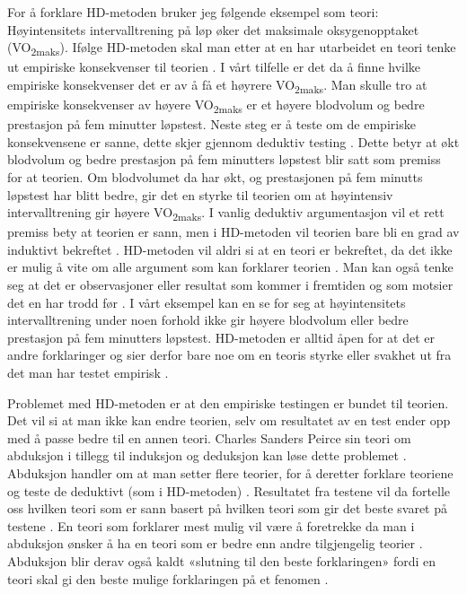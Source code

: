 \documentclass[
]{book}
\begin{document}
For å forklare HD-metoden bruker jeg følgende eksempel som teori: Høyintensitets intervalltrening på løp øker det maksimale oksygenopptaket (VO\textsubscript{2maks}). Ifølge HD-metoden skal man etter at en har utarbeidet en teori tenke ut empiriske konsekvenser til teorien \citep{hempel1966}. I vårt tilfelle er det da å finne hvilke empiriske konsekvenser det er av å få et høyrere VO\textsubscript{2maks}. Man skulle tro at empiriske konsekvenser av høyere VO\textsubscript{2maks} er et høyere blodvolum og bedre prestasjon på fem minutter løpstest. Neste steg er å teste om de empiriske konsekvensene er sanne, dette skjer gjennom deduktiv testing \citep{hempel1966}. Dette betyr at økt blodvolum og bedre prestasjon på fem minutters løpstest blir satt som premiss for at teorien. Om blodvolumet da har økt, og prestasjonen på fem minutts løpstest har blitt bedre, gir det en styrke til teorien om at høyintensiv intervalltrening gir høyere VO\textsubscript{2maks}. I vanlig deduktiv argumentasjon vil et rett premiss bety at teorien er sann, men i HD-metoden vil teorien bare bli en grad av induktivt bekreftet \citep{hempel1966}. HD-metoden vil aldri si at en teori er bekreftet, da det ikke er mulig å vite om alle argument som kan forklarer teorien \citep{hempel1966}. Man kan også tenke seg at det er observasjoner eller resultat som kommer i fremtiden og som motsier det en har trodd før \citep{hempel1966}. I vårt eksempel kan en se for seg at høyintensitets intervalltrening under noen forhold ikke gir høyere blodvolum eller bedre prestasjon på fem minutters løpstest. HD-metoden er alltid åpen for at det er andre forklaringer og sier derfor bare noe om en teoris styrke eller svakhet ut fra det man har testet empirisk \citep{hempel1966}.

Problemet med HD-metoden er at den empiriske testingen er bundet til teorien. Det vil si at man ikke kan endre teorien, selv om resultatet av en test ender opp med å passe bedre til en annen teori. Charles Sanders Peirce sin teori om abduksjon i tillegg til induksjon og deduksjon kan løse dette problemet \citep{peirce1992}. Abduksjon handler om at man setter flere teorier, for å deretter forklare teoriene og teste de deduktivt (som i HD-metoden) \citep{peirce1992}. Resultatet fra testene vil da fortelle oss hvilken teori som er sann basert på hvilken teori som gir det beste svaret på testene \citep{peirce1992}. En teori som forklarer mest mulig vil være å foretrekke da man i abduksjon ønsker å ha en teori som er bedre enn andre tilgjengelig teorier \citep{peirce1992}. Abduksjon blir derav også kaldt «slutning til den beste forklaringen» fordi en teori skal gi den beste mulige forklaringen på et fenomen \citep{peirce1992}.
\end{document}
